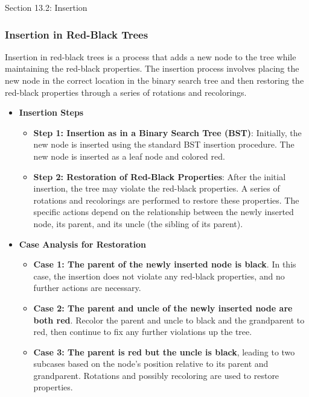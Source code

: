 \begin{notes}{Section 13.2: Insertion}
    \subsubsection*{Insertion in Red-Black Trees}

    Insertion in red-black trees is a process that adds a new node to the tree while maintaining the red-black properties. The insertion process involves placing the new node in the correct location 
    in the binary search tree and then restoring the red-black properties through a series of rotations and recolorings.
    
    \begin{itemize}
        \item \textbf{Insertion Steps}
        \begin{itemize}
            \item \textbf{Step 1: Insertion as in a Binary Search Tree (BST)}: Initially, the new node is inserted using the standard BST insertion procedure. The new node is inserted as a leaf node 
            and colored red.
            \item \textbf{Step 2: Restoration of Red-Black Properties}: After the initial insertion, the tree may violate the red-black properties. A series of rotations and recolorings are performed 
            to restore these properties. The specific actions depend on the relationship between the newly inserted node, its parent, and its uncle (the sibling of its parent).
        \end{itemize}
        
        \item \textbf{Case Analysis for Restoration}
        \begin{itemize}
            \item \textbf{Case 1: The parent of the newly inserted node is black}. In this case, the insertion does not violate any red-black properties, and no further actions are necessary.
            \item \textbf{Case 2: The parent and uncle of the newly inserted node are both red}. Recolor the parent and uncle to black and the grandparent to red, then continue to fix any further 
            violations up the tree.
            \item \textbf{Case 3: The parent is red but the uncle is black}, leading to two subcases based on the node's position relative to its parent and grandparent. Rotations and possibly 
            recoloring are used to restore properties.
        \end{itemize}
        

\end{itemize}
\end{notes}
